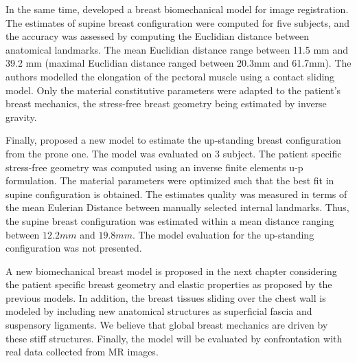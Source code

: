 In the same time, \cite{han_nonlinear_2014} developed a breast biomechanical model for image registration. The estimates of supine breast configuration were computed for five subjects, and the accuracy was assessed by computing the Euclidian distance between anatomical landmarks.  The mean Euclidian distance range between 11.5 mm and 39.2 mm (maximal Euclidian distance ranged between 20.3mm and 61.7mm). The authors modelled the elongation of the pectoral muscle using a contact sliding model. Only the material constitutive parameters were adapted to the patient’s breast mechanics, the stress-free breast geometry being estimated by inverse gravity. 

Finally, \cite{eiben_surface_2016} proposed a new model to estimate the up-standing breast configuration from the prone one. The model was evaluated on 3 subject. The patient specific stress-free geometry was computed using an inverse finite elements u-p formulation. The material parameters were optimized such that the best fit in supine configuration is obtained. The estimates quality was measured in terms of the mean Eulerian Distance between manually selected internal landmarks. Thus, the supine breast configuration was estimated within a mean distance ranging between $12.2mm$ and $19.8 mm$. The model evaluation for the up-standing configuration was not presented.

A new biomechanical breast model is proposed in the next chapter considering the patient specific breast geometry and elastic properties as proposed by the previous models. In addition, the breast tissues sliding over the chest wall is modeled by including new anatomical structures as superficial fascia and suspensory ligaments. We believe that global breast mechanics are driven by these stiff structures. Finally, the model will be evaluated by confrontation with real data collected from MR images.        
 
 

